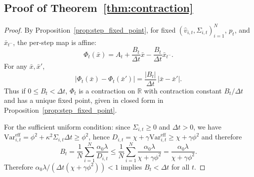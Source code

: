 \subsection*{Proof of Theorem~\ref{thm:contraction}}
\begin{proof}
By Proposition~\ref{prop:step_fixed_point}, for fixed $(\hat v_{i,t},\Sigma_{i,t})_{i=1}^N$, $p_t$, and $\bar x_{t^-}$, the per-step map is affine:
\[
 \Phi_t(\bar x)=A_t+\frac{B_t}{\Delta t}\bar x-\frac{B_t}{\Delta t}\bar x_{t^-}.
\]
For any $\bar x,\bar x'$,
\[
 |\Phi_t(\bar x)-\Phi_t(\bar x')|=\frac{|B_t|}{\Delta t}\,|\bar x-\bar x'|.
\]
Thus if $0\le B_t<\Delta t$, $\Phi_t$ is a contraction on $\mathbb R$ with contraction constant $B_t/\Delta t$ and has a unique fixed point,
given in closed form in Proposition~\ref{prop:step_fixed_point}.

For the sufficient uniform condition: since $\Sigma_{i,t}\ge 0$ and $\Delta t>0$, we have
$\mathrm{Var}^{\mathrm{eff}}_{i,t}=\phi^2+\kappa^2\Sigma_{i,t}\Delta t\ge \phi^2$, hence
$D_{i,t}=\chi+\gamma\mathrm{Var}^{\mathrm{eff}}_{i,t}\ge \chi+\gamma\phi^2$ and therefore
\[
 B_t=\frac{1}{N}\sum_{i=1}^N \frac{\alpha_0\lambda}{D_{i,t}}
 \le \frac{1}{N}\sum_{i=1}^N \frac{\alpha_0\lambda}{\chi+\gamma \phi^2}
 =\frac{\alpha_0\lambda}{\chi+\gamma\phi^2}.
\]
Therefore $\alpha_0\lambda/(\Delta t(\chi+\gamma\phi^2))<1$ implies $B_t<\Delta t$ for all $t$.
\end{proof}

